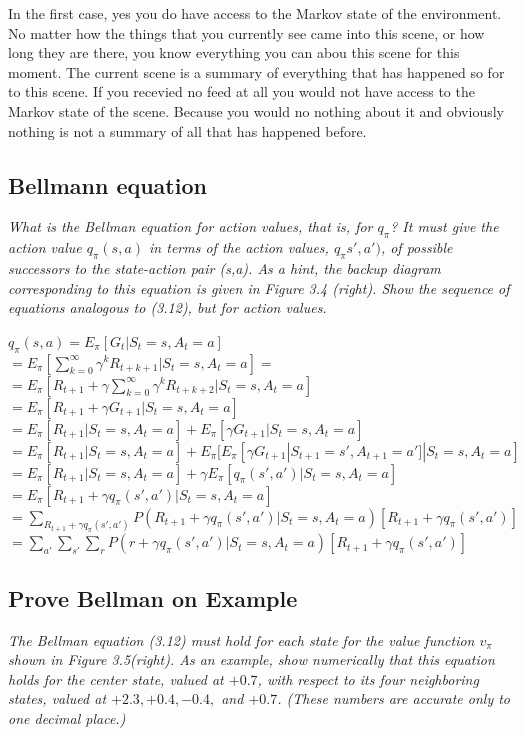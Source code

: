 \documentclass[12pt,a4paper]{article}
\begin{document}
In the first case, yes you do have access to the Markov state of the environment. No matter how the things that you currently see came into this scene, or how long they are there, you know everything you can abou this scene for this moment. The current scene is a summary of everything that has happened so for to this scene. 
If you recevied no feed at all you would not have access to the Markov state of the scene. Because you would no nothing about it and obviously nothing is not a summary of all that has happened before. 

\subsection{Bellmann equation}
\textit{What is the Bellman equation for action values, that is, for $q_{\pi}$? It must give the action value $q_{\pi}(s,a)$ in terms of the action values, $q_{\pi}s',a')$, of possible successors to the state-action pair (s,a). As a hint, the backup diagram corresponding to this equation is given in Figure 3.4 (right). Show the sequence of equations analogous to (3.12), but for action values.}

	$	q_{\pi}(s,a) = E_{\pi}[G_t| S_t = s, A_t = a] $\\
$= E_{\pi}[\sum_{k=0}^{\infty}\gamma^kR_{t+k+1}| S_t = s, A_t = a] =$\\
$= E_{\pi}[R_{t+1} + \gamma \sum_{k=0}^{\infty} \gamma^k R_{t+k+2}| S_t = s, A_t = a]$\\ 
$= E_{\pi}[R_{t+1} + \gamma G_{t+1}| S_t = s, A_t = a]$\\
$= E_{\pi}[R_{t+1}| S_t = s, A_t = a] + E_{\pi}[\gamma G_{t+1}| S_t = s, A_t = a]$\\
$= E_{\pi}[R_{t+1}| S_t = s, A_t = a] + E_{\pi}[E_{\pi}[\gamma G_{t+1}| S_{t+1}=s', A_{t+1}=a']| S_t=s, A_t=a]$ 
$= E_{\pi}[R_{t+1}| S_t = s, A_t = a] + \gamma E_{\pi}[q_{\pi}(s',a')| S_t = s, A_t = a]$\\
$= E_{\pi}[R_{t+1} + \gamma q_{\pi}(s',a')|S_t = s, A_t = a]$\\
$= \sum_{R_{t+1}+\gamma q_{\pi}(s',a')}^{} P(R_{t+1} + \gamma q_{\pi}(s',a')| S_t = s , A_t = a)[R_{t+1} + \gamma q_{\pi}(s',a')]$\\
$= \sum_{a'} \sum_{s'} \sum_{r} P(r + \gamma q_{\pi}(s',a')|S_t = s, A_t = a)[R_{t+1} + \gamma q_{\pi}(s',a')]$

\subsection{Prove Bellman on Example}
\textit{The Bellman equation (3.12) must hold for each state for the value function $v_{\pi}$ shown in Figure 3.5(right). As an example, show numerically that this equation holds for the center state, valued at $+0.7$, with respect to its four neighboring states, valued at $+2.3, +0.4, -0.4,$ and $+0.7$. (These numbers are accurate only to one decimal place.)}
\end{document}
